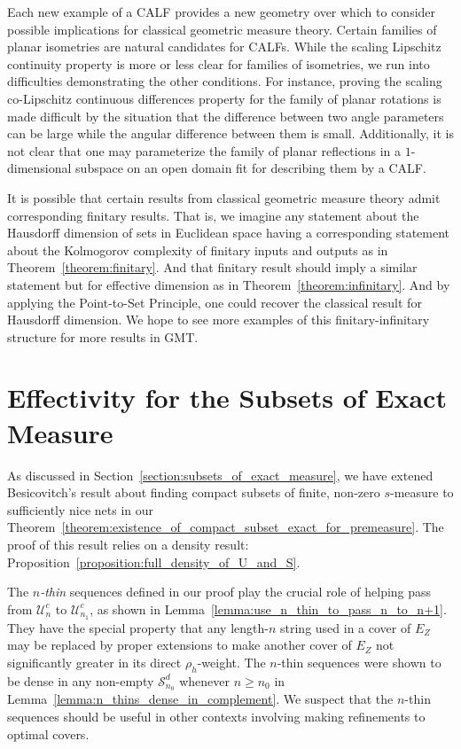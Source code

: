 Each new example of a CALF provides a new geometry over which to consider possible implications for classical geometric measure theory. Certain families of planar isometries are natural candidates for CALFs. While the scaling Lipschitz continuity property is more or less clear for families of isometries, we run into difficulties demonstrating the other conditions. For instance, proving the scaling co-Lipschitz continuous differences property for the family of planar rotations is made difficult by the situation that the difference between two angle parameters can be large while the angular difference between them is small. Additionally, it is not clear that one may parameterize the family of planar reflections in a $1$-dimensional subspace on an open domain fit for describing them by a CALF. 

It is possible that certain results from classical geometric measure theory admit corresponding finitary results. That is, we imagine any statement about the Hausdorff dimension of sets in Euclidean space having a corresponding statement about the Kolmogorov complexity of finitary inputs and outputs as in Theorem~\ref{theorem:finitary}. And that finitary result should imply a similar statement but for effective dimension as in Theorem~\ref{theorem:infinitary}. And by applying the Point-to-Set Principle, one could recover the classical result for Hausdorff dimension. We hope to see more examples of this finitary-infinitary structure for more results in GMT. 

\section{Effectivity for the Subsets of Exact Measure}

As discussed in Section~\ref{section:subsets_of_exact_measure}, we have extened Besicovitch's result about finding compact subsets of finite, non-zero $s$-measure to sufficiently nice nets in our Theorem~\ref{theorem:existence_of_compact_subset_exact_for_premeasure}. The proof of this result relies on a density result: Proposition~\ref{proposition:full_density_of_U_and_S}. 

The \textit{$n$-thin} sequences defined in our proof play the crucial role of helping pass from $\mathcal{U}^c_n$ to $\mathcal{U}^c_{n _ 1}$, as shown in Lemma~\ref{lemma:use_n_thin_to_pass_n_to_n+1}. They have the special property that any length-$n$ string used in a cover of $E_Z$ may be replaced by proper extensions to make another cover of $E_Z$ not significantly greater in its direct $\rho_h$-weight. The $n$-thin sequences were shown to be dense in any non-empty $\mathcal{S}^d_{n_0}$ whenever $n \geq n_0$ in Lemma~\ref{lemma:n_thins_dense_in_complement}. We suspect that the $n$-thin sequences should be useful in other contexts involving making refinements to optimal covers. 

